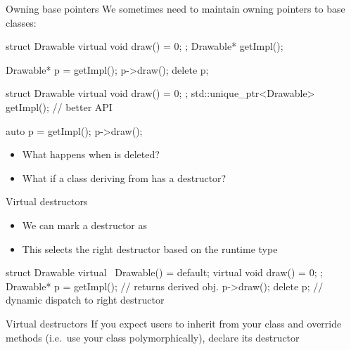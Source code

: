 \begin{frame}[fragile]
  \begin{block}{Owning base pointers}
    We sometimes need to maintain owning pointers to base classes:
  \end{block}
  \begin{overprint}
  \begin{cppcode}
    struct Drawable {
       virtual void draw() = 0;
    };
    Drawable* getImpl();

    Drawable* p = getImpl();
    p->draw();
    delete p;
  \end{cppcode}
  \begin{cppcode}
    struct Drawable {
       virtual void draw() = 0;
    };
    std::unique_ptr<Drawable> getImpl(); // better API

    auto p = getImpl();
    p->draw();
  \end{cppcode}
  \end{overprint}
  \begin{block}{}
    \begin{itemize}
      \item What happens when  is deleted?
      \item What if a class deriving from  has a destructor?
    \end{itemize}
  \end{block}
\end{frame}

\begin{frame}[fragile]
  \begin{block}{Virtual destructors}
    \begin{itemize}
    \item We can mark a destructor as 
    \item This selects the right destructor based on the runtime type
    \end{itemize}
  \end{block}
  \begin{cppcode}
    struct Drawable {
       virtual ~Drawable() = default;
       virtual void draw() = 0;
    };
    Drawable* p = getImpl(); // returns derived obj.
    p->draw();
    delete p; // dynamic dispatch to right destructor
  \end{cppcode}
  \begin{goodpractice}{Virtual destructors}
    If you expect users to inherit from your class and override methods (i.e.\ use your class polymorphically), declare its destructor 
  \end{goodpractice}
\end{frame}

